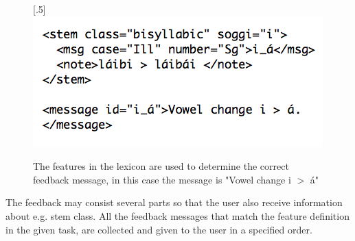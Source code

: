 \documentclass[11pt]{article}
\begin{document}
\begin{figure}[htbp]
\begin{center}
\scalebox{.5}[.5]{\includegraphics{presentation/img/morphfeedbackEng.png}}\\
\caption{The features in the lexicon are used to determine the correct feedback message, in this case the message is "Vowel change i $>$ á"}
\label{feedbacknouns}
\end{center}
\end{figure}

The feedback may consist several parts so that the user also receive information about e.g. stem class. All the feedback messages that match the feature definition in the given task, are collected and given to the user in a specified order. 

%
\end{document}
